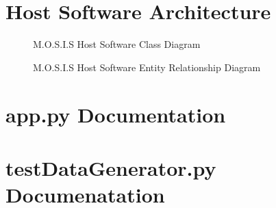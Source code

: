 \documentclass[12pt]{article}
\begin{document}
\section{Host Software Architecture}
\begin{figure}[H]
  \caption{M.O.S.I.S Host Software Class Diagram}
\end{figure}
\begin{figure}[H]
  \caption{M.O.S.I.S Host Software Entity Relationship Diagram}
\end{figure}
\section{app.py Documentation}

\section{testDataGenerator.py Documenatation}

\end{document}

